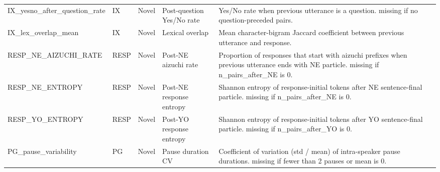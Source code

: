 {\begin{longtable}{lllp{2.5cm}p{4.5cm}}
IX\_yesno\_after\_question\_rate & IX & Novel & Post-question Yes/No rate & Yes/No rate when previous utterance is a question. missing if no question-preceded pairs. \\
IX\_lex\_overlap\_mean & IX & Novel & Lexical overlap & Mean character-bigram Jaccard coefficient between previous utterance and response. \\
RESP\_NE\_AIZUCHI\_RATE & RESP & Novel & Post-NE aizuchi rate & Proportion of responses that start with aizuchi prefixes when previous utterance ends with NE particle. missing if n\_pairs\_after\_NE is 0. \\
RESP\_NE\_ENTROPY & RESP & Novel & Post-NE response entropy & Shannon entropy of response-initial tokens after NE sentence-final particle. missing if n\_pairs\_after\_NE is 0. \\
RESP\_YO\_ENTROPY & RESP & Novel & Post-YO response entropy & Shannon entropy of response-initial tokens after YO sentence-final particle. missing if n\_pairs\_after\_YO is 0. \\
PG\_pause\_variability & PG & Novel & Pause duration CV & Coefficient of variation (std / mean) of intra-speaker pause durations. missing if fewer than 2 pauses or mean is 0. \\
\bottomrule
\end{longtable}
}
